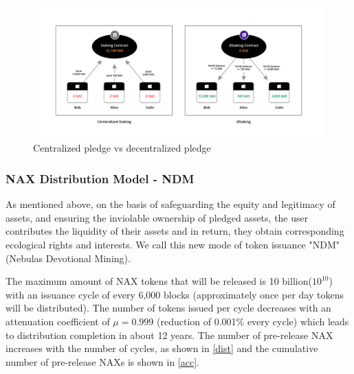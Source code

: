 \begin{figure}[htbp]
  \centering
  \includegraphics[width=1\textwidth]{../common/dStaking.pdf}
  \caption{Centralized pledge vs decentralized pledge\label{fig:dStaking}}
\end{figure}

\subsubsection{NAX Distribution Model - NDM}
As mentioned above, on the basis of safeguarding the equity and legitimacy of assets, and ensuring the inviolable ownership of pledged assets, the user contributes the liquidity of their assets and in return, they obtain corresponding ecological rights and interests. We call this new mode of token issuance "NDM" (Nebulas Devotional Mining). 

The maximum amount of NAX tokens that will be released is 10 billion(\(10^{10}\)) with an issuance cycle of every 6,000 blocks (approximately once per day tokens will be distributed). The number of tokens issued per cycle decreases with an attenuation coefficient of $\mu=0.999$ (reduction of 0.001\% every cycle) which leads to distribution completion in about 12 years. The number of pre-release NAX increases with the number of cycles, as shown in \ref{dist} and the cumulative number of pre-release NAXs is shown in \ref{acc}.

